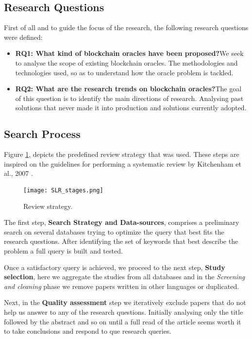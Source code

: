 \subsection{Research Questions}
First of all and to guide the focus of the research, the following research questions were defined:
\begin{itemize}
  \item \textbf{RQ1:\label{RQ1} What kind of blockchain oracles have been proposed?}\newline We seek to analyse the scope of existing blockchain oracles. The methodologies and technologies used, so as to understand how the oracle problem is tackled.
  \item \textbf{RQ2:\label{RQ2} What are the research trends on blockchain oracles?}\newline The goal of this question is to identify the main directions of research. Analysing past solutions that never made it into production and solutions currently adopted.
\end{itemize}


\subsection{Search Process}\label{search-process}
Figure \ref{fig:/figures/SLR_stages}, depicts the predefined review strategy that was used. These steps are inspired on the guidelines for performing a systematic review by Kitchenham et al., 2007 \cite{Kitchenham2007}.

\begin{figure}[h]
  \begin{center}
    \leavevmode
    \texttt{[image: SLR\_stages.png]}
    \caption{Review strategy.}
    \label{fig:/figures/SLR_stages}
  \end{center}
\end{figure}

The first step, \textbf{Search Strategy and Data-sources}, comprises a preliminary search on several databases trying to optimize the query that best fits the research questions. After identifying the set of keywords that best describe the problem a full query is built and tested.

Once a satisfactory query is achieved, we proceed to the next step, \textbf{Study selection}, here we aggregate the studies from all databases and in the \textit{Screening and cleaning} phase we remove papers written in other languages or duplicated.

Next, in the \textbf{Quality assessment} step we iteratively exclude papers that do not help us answer to any of the research questions. Initially analysing only the title followed by the abstract and so on until a full read of the article seems worth it to take conclusions and respond to que research queries.

